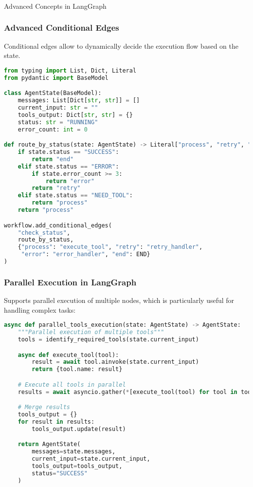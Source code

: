 \begin{frame}[fragile]\frametitle{}
\begin{center}
{\Large Advanced Concepts in LangGraph}
\end{center}
\end{frame}

\begin{frame}[fragile]\frametitle{Advanced Conditional Edges}

Conditional edges allow to dynamically decide the execution flow based on the state.

      \begin{lstlisting}[language=Python, basicstyle=\tiny]
from typing import List, Dict, Literal
from pydantic import BaseModel

class AgentState(BaseModel):
    messages: List[Dict[str, str]] = []
    current_input: str = ""
    tools_output: Dict[str, str] = {}
    status: str = "RUNNING"
    error_count: int = 0

def route_by_status(state: AgentState) -> Literal["process", "retry", "error", "end"]:
    if state.status == "SUCCESS":
        return "end"
    elif state.status == "ERROR":
        if state.error_count >= 3:
            return "error"
        return "retry"
    elif state.status == "NEED_TOOL":
        return "process"
    return "process"

workflow.add_conditional_edges(
    "check_status",
    route_by_status,
    {"process": "execute_tool", "retry": "retry_handler", 
     "error": "error_handler", "end": END}
)
      \end{lstlisting}
\end{frame}

\begin{frame}[fragile]\frametitle{Parallel Execution in LangGraph}
Supports parallel execution of multiple nodes, which is particularly useful for handling complex tasks:

      \begin{lstlisting}[language=Python, basicstyle=\tiny]
async def parallel_tools_execution(state: AgentState) -> AgentState:
    """Parallel execution of multiple tools"""
    tools = identify_required_tools(state.current_input)

    async def execute_tool(tool):
        result = await tool.ainvoke(state.current_input)
        return {tool.name: result}

    # Execute all tools in parallel
    results = await asyncio.gather(*[execute_tool(tool) for tool in tools])

    # Merge results
    tools_output = {}
    for result in results:
        tools_output.update(result)

    return AgentState(
        messages=state.messages,
        current_input=state.current_input,
        tools_output=tools_output,
        status="SUCCESS"
    )
      \end{lstlisting}
\end{frame}


